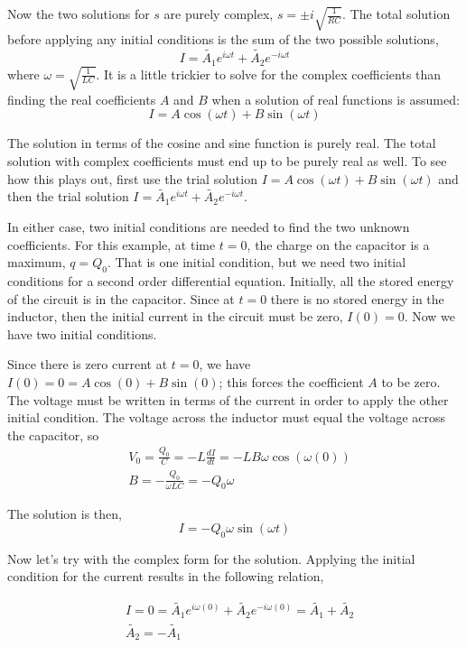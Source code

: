 \documentclass[12pt]{article}
\begin{document}
\begin{flushleft}
Now the two solutions for $s$ are purely complex, $s=\pm i\sqrt{\frac{1}{RC}}$.  The total solution before applying any initial conditions is the sum of the two possible solutions,
\begin{equation}
I = \tilde{A_{1}}e^{i\omega t} + \tilde{A_{2}}e^{-i\omega t}
\label{eq:icomplex}
\end{equation}
where $\omega=\sqrt{\frac{1}{LC}}$.  It is a little trickier to solve for the complex coefficients than finding the real coefficients $A$ and $B$ when a solution of real functions is assumed:
\[
I=A\cos{(\omega t)} + B\sin{(\omega t)}
\]

The solution in terms of the cosine and sine function is purely real.  The total solution with complex coefficients must end up to be purely real as well.  To see how this plays out, first use the trial solution $I=A\cos{(\omega t)} + B\sin{(\omega t)}$ and then the trial solution $I = \tilde{A_{1}}e^{i\omega t} + \tilde{A_{2}}e^{-i\omega t}$.

In either case, two initial conditions are needed to find the two unknown coefficients.  For this example, 
at time $t=0$, the charge on the capacitor is a maximum, $q=Q_{0}$.  That is one initial condition, but we need two initial conditions for a second order differential equation.  Initially, all the stored energy of the circuit is in the capacitor.  Since at $t=0$ there is no stored energy in the inductor, then the initial current in the circuit must be zero, $I(0)=0$.  Now we have two initial conditions.

Since there is zero current  at $t=0$, we have $I(0)=0=A\cos{(0)} + B\sin{(0)}$; this forces the coefficient $A$ to be zero.  The voltage must be written in terms of the current in order to apply the other initial condition.  The voltage across the inductor must equal the voltage across the capacitor, so
\begin{equation*}
\begin{aligned}
& V_{0}=\frac{Q_{0}}{C}=-L\frac{dI}{dt}=-LB\omega\cos{(\omega(0))} \\
& B=-\frac{Q_{0}}{\omega LC}=-Q_{0}\omega
\end{aligned} 
\end{equation*}

The solution is then,
\[
I=-Q_{0}\omega\sin{(\omega t)}
\]

Now let's try with the complex form for the solution.  Applying the initial condition for the current results in the following relation,

\begin{equation}
\begin{aligned}
& I = 0 = \tilde{A_{1}}e^{i\omega (0)} + \tilde{A_{2}}e^{-i\omega (0)} = \tilde{A_{1}} + \tilde{A_{2}} \\
& \tilde{A_{2}} =- \tilde{A_{1}}
\label{eq:a1a2}
\end{aligned} 
\end{equation}


\end{flushleft}
\end{document}
